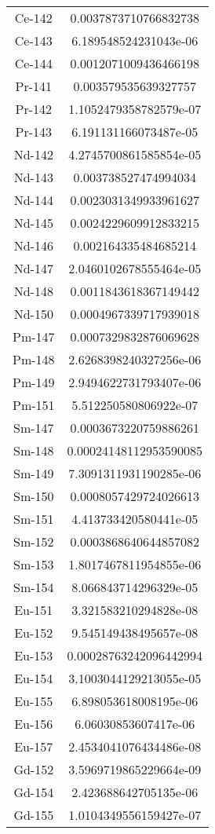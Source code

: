 \begin{table}[h!]
\begin{tabular}{|| c || c |}
Ce-142 & 0.0037873710766832738 \\
Ce-143 & 6.189548524231043e-06 \\
Ce-144 & 0.0012071009436466198 \\
Pr-141 & 0.003579535639327757 \\
Pr-142 & 1.1052479358782579e-07 \\
Pr-143 & 6.191131166073487e-05 \\
Nd-142 & 4.2745700861585854e-05 \\
Nd-143 & 0.003738527474994034 \\
Nd-144 & 0.0023031349933961627 \\
Nd-145 & 0.0024229609912833215 \\
Nd-146 & 0.002164335484685214 \\
Nd-147 & 2.0460102678555464e-05 \\
Nd-148 & 0.0011843618367149442 \\
Nd-150 & 0.0004967339717939018 \\
Pm-147 & 0.0007329832876069628 \\
Pm-148 & 2.6268398240327256e-06 \\
Pm-149 & 2.9494622731793407e-06 \\
Pm-151 & 5.512250580806922e-07 \\
Sm-147 & 0.0003673220759886261 \\
Sm-148 & 0.00024148112953590085 \\
Sm-149 & 7.3091311931190285e-06 \\
Sm-150 & 0.0008057429724026613 \\
Sm-151 & 4.413733420580441e-05 \\
Sm-152 & 0.0003868640644857082 \\
Sm-153 & 1.8017467811954855e-06 \\
Sm-154 & 8.066843714296329e-05 \\
Eu-151 & 3.321583210294828e-08 \\
Eu-152 & 9.545149438495657e-08 \\
Eu-153 & 0.00028763242096442994 \\
Eu-154 & 3.1003044129213055e-05 \\
Eu-155 & 6.898053618008195e-06 \\
Eu-156 & 6.06030853607417e-06 \\
Eu-157 & 2.4534041076434486e-08 \\
Gd-152 & 3.5969719865229664e-09 \\
Gd-154 & 2.423688642705135e-06 \\
Gd-155 & 1.0104349556159427e-07 \\

\end{tabular}
\end{table}
